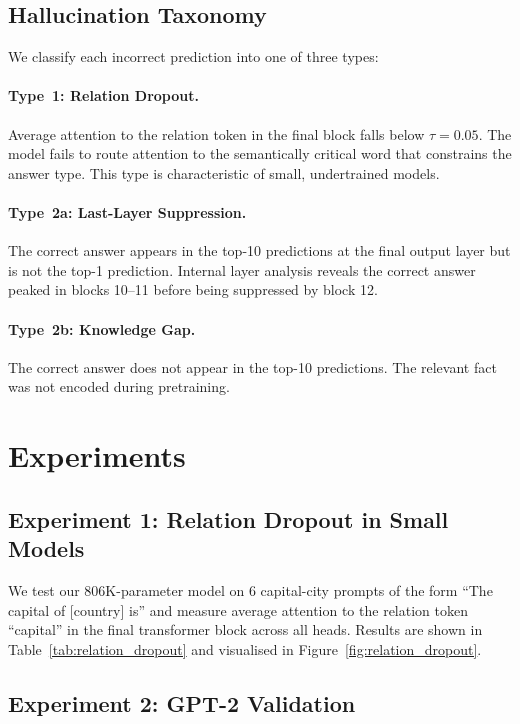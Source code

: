 \documentclass[11pt,a4paper]{article}
\begin{document}
\subsection{Hallucination Taxonomy}
\label{sec:taxonomy}

We classify each incorrect prediction into one of three types:

\paragraph{Type~1: Relation Dropout.}
Average attention to the relation token in the final block
falls below $\tau = 0.05$. The model fails to route attention
to the semantically critical word that constrains the answer
type. This type is characteristic of small, undertrained models.

\paragraph{Type~2a: Last-Layer Suppression.}
The correct answer appears in the top-10 predictions at the
final output layer but is not the top-1 prediction. Internal
layer analysis reveals the correct answer peaked in blocks
10--11 before being suppressed by block 12.

\paragraph{Type~2b: Knowledge Gap.}
The correct answer does not appear in the top-10 predictions.
The relevant fact was not encoded during pretraining.

\section{Experiments}

\subsection{Experiment 1: Relation Dropout in Small Models}

We test our 806K-parameter model on 6 capital-city prompts
of the form ``The capital of [country] is'' and measure
average attention to the relation token ``capital'' in the
final transformer block across all heads. Results are shown
in Table~\ref{tab:relation_dropout} and visualised in
Figure~\ref{fig:relation_dropout}.

\subsection{Experiment 2: GPT-2 Validation}
\end{document}
